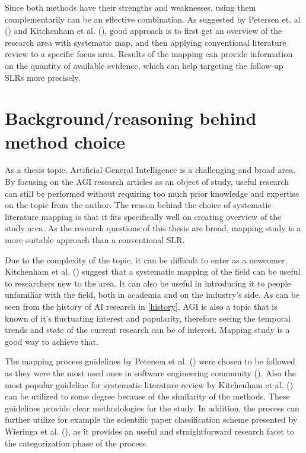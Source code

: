 \documentclass[utf8,english]{gradu3}
\begin{document}
Since both methods have their strengths and weaknesses, using them
complementarily can be an effective combination. As suggested by Petersen et. al
(\cite*{petersen2008}) and Kitchenham et al. (\cite{kitchenham2010}), good
approach is to first get an overview of the research area with systematic map,
and then applying conventional literature review to a specific focus area.
Results of the mapping can provide information on the quantity of available
evidence, which can help targeting the follow-up SLRs more precisely.


\section{Background/reasoning behind method choice}

As a thesis topic, Artificial General Intelligence is a challenging and broad
area. By focusing on the AGI research articles as an object of study, useful
research can still be performed without requiring too much prior knowledge and
expertise on the topic from the author. The reason behind the choice of
systematic literature mapping is that it fits specifically well on creating
overview of the study area. As the research questions of this thesis are broad,
mapping study is a more suitable approach than a conventional SLR.

Due to the complexity of the topic, it can be difficult to enter as a newcomer.
Kitchenham et al. (\cite*{kitchenham2010}) suggest that a systematic mapping of
the field can be useful to researchers new to the area.  It can also be useful
in introducing it to people unfamiliar with the field, both in academia and on
the industry's side. As can be seen from the history of AI research in
\ref{history}, AGI is also a topic that is known of it's fluctuating interest
and popularity, therefore seeing the temporal trends and state of the current
research can be of interest. Mapping study is a good way to achieve that. 

The mapping process guidelines by Petersen et al.
(\cite*{petersen2008,petersen2015}) were chosen to be followed as they were the
most used ones in software engineering community (\cite{petersen2015}). Also the
most popular guideline for systematic literature review by Kitchenham et al.
(\cite*{kitchenham2007}) can be utilized to some degree because of the similarity
of the methods. These guidelines provide clear methodologies for the study. In
addition, the process can further utilize for example the scientific paper
classification scheme presented by Wieringa et al. (\cite{wieringa2006}), as it
provides an useful and straightforward research facet to the categorization
phase of the process. 
\end{document}
